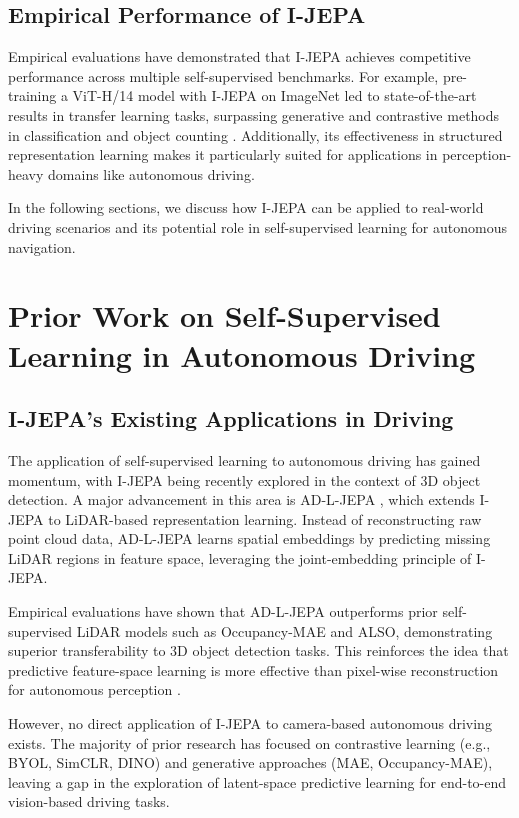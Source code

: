 \documentclass{article}
\begin{document}
\subsection{Empirical Performance of I-JEPA}
Empirical evaluations have demonstrated that I-JEPA achieves competitive performance across multiple self-supervised benchmarks. For example, pre-training a ViT-H/14 model with I-JEPA on ImageNet led to state-of-the-art results in transfer learning tasks, surpassing generative and contrastive methods in classification and object counting \citep{jean2023ijepa}. Additionally, its effectiveness in structured representation learning makes it particularly suited for applications in perception-heavy domains like autonomous driving.

In the following sections, we discuss how I-JEPA can be applied to real-world driving scenarios and its potential role in self-supervised learning for autonomous navigation.


\section{Prior Work on Self-Supervised Learning in Autonomous Driving}

\subsection{I-JEPA’s Existing Applications in Driving}

The application of self-supervised learning to autonomous driving has gained momentum, with I-JEPA being recently explored in the context of 3D object detection. A major advancement in this area is AD-L-JEPA \citep{zhu2025adljepa}, which extends I-JEPA to LiDAR-based representation learning. Instead of reconstructing raw point cloud data, AD-L-JEPA learns spatial embeddings by predicting missing LiDAR regions in feature space, leveraging the joint-embedding principle of I-JEPA.

Empirical evaluations have shown that AD-L-JEPA outperforms prior self-supervised LiDAR models such as Occupancy-MAE and ALSO, demonstrating superior transferability to 3D object detection tasks. This reinforces the idea that predictive feature-space learning is more effective than pixel-wise reconstruction for autonomous perception \citep{zhu2025adljepa}.

However, no direct application of I-JEPA to camera-based autonomous driving exists. The majority of prior research has focused on contrastive learning (e.g., BYOL, SimCLR, DINO) and generative approaches (MAE, Occupancy-MAE), leaving a gap in the exploration of latent-space predictive learning for end-to-end vision-based driving tasks.
\end{document}
